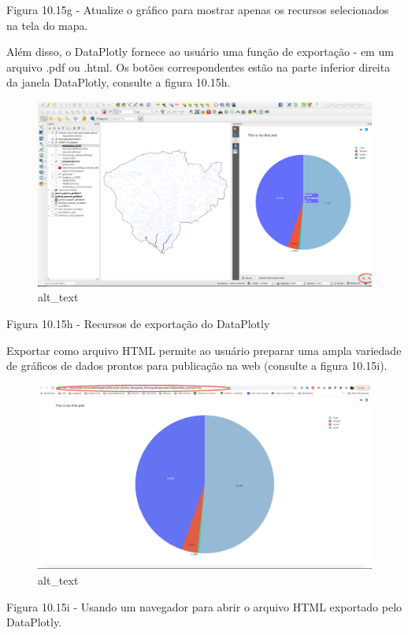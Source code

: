 \documentclass[
]{book}
\begin{document}
Figura 10.15g - Atualize o gráfico para mostrar apenas os recursos selecionados na tela do mapa.

Além disso, o DataPlotly fornece ao usuário uma função de exportação - em um arquivo .pdf ou .html. Os botões correspondentes estão na parte inferior direita da janela DataPlotly, consulte a figura 10.15h.

\begin{figure}
\centering
\includegraphics{media/modulo10/fig1015_h.png}
\caption{alt\_text}
\end{figure}

Figura 10.15h - Recursos de exportação do DataPlotly

Exportar como arquivo HTML permite ao usuário preparar uma ampla variedade de gráficos de dados prontos para publicação na web (consulte a figura 10.15i).

\begin{figure}
\centering
\includegraphics{media/modulo10/fig1015_i.png}
\caption{alt\_text}
\end{figure}

Figura 10.15i - Usando um navegador para abrir o arquivo HTML exportado pelo DataPlotly.
\end{document}
